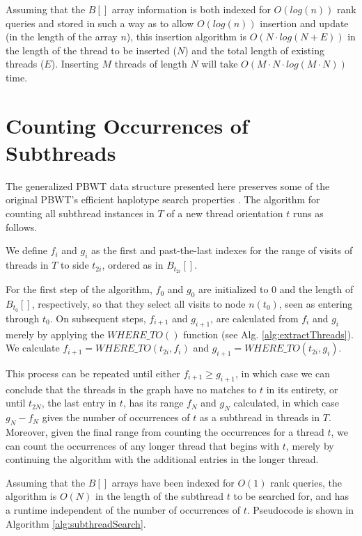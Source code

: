 Assuming that the $B[]$ array information is both indexed for $O(log(n))$ rank queries and stored in such a way as to allow $O(log(n))$ insertion and update (in the length of the array $n$), this insertion algorithm is $O(N \cdot log (N + E))$ in the length of the thread to be inserted ($N$) and the total length of existing threads ($E$). Inserting $M$ threads of length $N$ will take $O(M \cdot N \cdot log(M \cdot N))$ time. 

\section{Counting Occurrences of Subthreads}

The generalized PBWT data structure presented here preserves some of the original PBWT's efficient haplotype search properties \cite{durbin2014efficient}. The algorithm for counting all subthread instances in $T$ of a new thread orientation $t$ runs as follows.

We define $f_i$ and $g_i$ as the first and past-the-last indexes for the range of visits of threads in $T$ to side $t_{2i}$, ordered as in $B_{t_{2i}}[]$.

For the first step of the algorithm, $f_0$ and $g_0$ are initialized to $0$ and the length of $B_{t_0}[]$, respectively, so that they select all visits to node $n(t_0)$, seen as entering through $t_0$. On subsequent steps, $f_{i+1}$ and $g_{i+1}$, are calculated from $f_i$ and $g_i$ merely by applying the $WHERE\_TO()$ function (see Alg. \ref{alg:extractThreads}). We calculate $f_{i+1} = WHERE\_TO(t_{2i}, f_i)$ and $g_{i+1} = WHERE\_TO(t_{2i}, g_i)$.

This process can be repeated until either $f_{i+1} \geq g_{i+1}$, in which case we can conclude that the threads in the graph have no matches to $t$ in its entirety, or until $t_{2N}$, the last entry in $t$, has its range $f_N$ and $g_N$ calculated, in which case $g_N - f_N$ gives the number of occurrences of $t$ as a subthread in threads in $T$. Moreover, given the final range from counting the occurrences for a thread $t$, we can count the occurrences of any longer thread that begins with $t$, merely by continuing the algorithm with the additional entries in the longer thread.

Assuming that the $B[]$ arrays have been indexed for $O(1)$ rank queries, the algorithm is $O(N)$ in the length of the subthread $t$ to be searched for, and has a runtime independent of the number of occurrences of $t$. Pseudocode is shown in Algorithm \ref{alg:subthreadSearch}.

